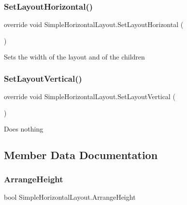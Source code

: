 \subsubsection{\texorpdfstring{Set\+Layout\+Horizontal()}{SetLayoutHorizontal()}}
{\footnotesize\ttfamily override void Simple\+Horizontal\+Layout.\+Set\+Layout\+Horizontal (\begin{DoxyParamCaption}{ }\end{DoxyParamCaption})\hspace{0.3cm}{\ttfamily [inline]}}



Sets the width of the layout and of the children 

\mbox{\label{class_simple_horizontal_layout_ae09e6c347baf860b63cb9ab1f42d3d95}} 
\subsubsection{\texorpdfstring{Set\+Layout\+Vertical()}{SetLayoutVertical()}}
{\footnotesize\ttfamily override void Simple\+Horizontal\+Layout.\+Set\+Layout\+Vertical (\begin{DoxyParamCaption}{ }\end{DoxyParamCaption})\hspace{0.3cm}{\ttfamily [inline]}}



Does nothing 



\subsection{Member Data Documentation}
\mbox{\label{class_simple_horizontal_layout_afd08bf7970a6d9e82943384e44ef8339}} 
\subsubsection{\texorpdfstring{Arrange\+Height}{ArrangeHeight}}
{\footnotesize\ttfamily bool Simple\+Horizontal\+Layout.\+Arrange\+Height}

